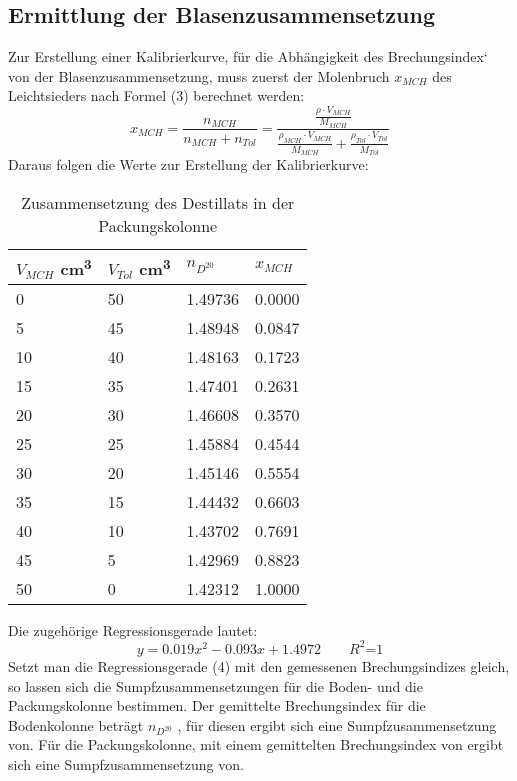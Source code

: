 \documentclass{article}
\begin{document}
\subsection{Ermittlung der Blasenzusammensetzung} %
Zur Erstellung einer Kalibrierkurve, für die Abhängigkeit des Brechungsindex‘ von der
Blasenzusammensetzung, muss zuerst der Molenbruch $x_{MCH}$
des Leichtsieders nach Formel (3) berechnet werden:
\begin{equation}
  x_{MCH} = \frac{n_{MCH}}{n_{MCH}+n_{Tol}} = \frac{\frac{\rho \cdot V_{MCH}}{M_{MCH}}}{\frac{\rho _{MCH} \cdot V_{MCH}}{M_{MCH}}+\frac{\rho _{Tol} \cdot V_{Tol}}{M_{Tol}}}
\end{equation}
Daraus folgen die Werte zur Erstellung der Kalibrierkurve:
\begin{table}[ht!]
  \centering
 \begin{tabularx}{\textwidth}{XXXX}
$V_{MCH}$ \si{\cubic\centi\meter} & $V_{Tol}$ \si{\cubic\centi\meter}  & $n_{D^{20}}$ & $x_{MCH}$  \\
\hline
\rowcolor{LightCyan}
0  & 50& 1.49736 & 0.0000\\
5  & 45& 1.48948 & 0.0847\\
\rowcolor{LightCyan}
10 & 40& 1.48163 & 0.1723\\
15 & 35& 1.47401 & 0.2631\\
\rowcolor{LightCyan}
20 & 30& 1.46608 & 0.3570\\
25 & 25& 1.45884 & 0.4544\\
\rowcolor{LightCyan}
30 & 20& 1.45146 & 0.5554\\
35 & 15& 1.44432 & 0.6603\\
\rowcolor{LightCyan}
40 & 10& 1.43702 & 0.7691\\
45 & 5 & 1.42969 & 0.8823\\
\rowcolor{LightCyan}
50 & 0 & 1.42312 & 1.0000\\
\end{tabularx}
  \caption{Zusammensetzung des Destillats in der Packungskolonne}
\end{table}
Die zugehörige Regressionsgerade lautet:
\begin{equation}
  y = 0.019 x^2 -0.093 x + 1.4972
   \qquad \text{$R^2$=1}
\end{equation}
Setzt man die Regressionsgerade (4) mit den gemessenen Brechungsindizes gleich, so lassen
sich die Sumpfzusammensetzungen für die Boden- und die Packungskolonne bestimmen.
Der gemittelte Brechungsindex für die Bodenkolonne beträgt $n_{D^{20}}$
, für diesen ergibt sich eine Sumpfzusammensetzung von. Für die Packungskolonne, mit
einem gemittelten Brechungsindex von ergibt sich eine Sumpfzusammensetzung von.
\end{document}

